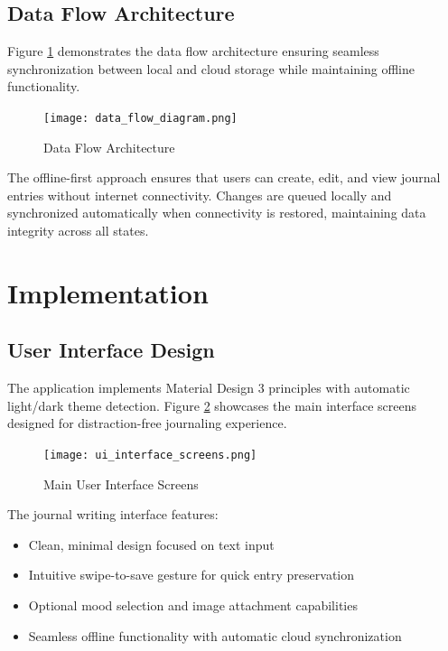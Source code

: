 \documentclass[conference]{IEEEtran}
\begin{document}
\subsection{Data Flow Architecture}

Figure \ref{fig:data_flow} demonstrates the data flow architecture ensuring seamless synchronization between local and cloud storage while maintaining offline functionality.

\begin{figure}[htbp]
\centerline{\texttt{[image: data\_flow\_diagram.png]}}
\caption{Data Flow Architecture}
\label{fig:data_flow}
\end{figure}

The offline-first approach ensures that users can create, edit, and view journal entries without internet connectivity. Changes are queued locally and synchronized automatically when connectivity is restored, maintaining data integrity across all states.

\section{Implementation}

\subsection{User Interface Design}

The application implements Material Design 3 principles with automatic light/dark theme detection. Figure \ref{fig:ui_screens} showcases the main interface screens designed for distraction-free journaling experience.

\begin{figure}[htbp]
\centerline{\texttt{[image: ui\_interface\_screens.png]}}
\caption{Main User Interface Screens}
\label{fig:ui_screens}
\end{figure}

The journal writing interface features:
\begin{itemize}
\item Clean, minimal design focused on text input
\item Intuitive swipe-to-save gesture for quick entry preservation
\item Optional mood selection and image attachment capabilities
\item Seamless offline functionality with automatic cloud synchronization
\end{itemize}
\end{document}
